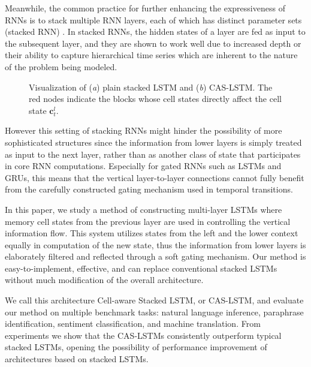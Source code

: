 \documentclass[wcp]{jmlr}
\begin{document}
    Meanwhile, the common practice for further enhancing  the expressiveness of RNNs is to stack multiple RNN layers, each of which has distinct parameter sets (stacked RNN) \citep{schmidhuber1992learning,el1996hierarchical}.
    In stacked RNNs, the hidden states of a layer are fed as input to the subsequent layer, and they are shown to work well due to increased depth \citep{pascanu2014construct} or their ability to capture hierarchical time series \citep{hermans2013training} which are inherent to the nature of the problem being modeled.
    
    \begin{figure}[tb]
        \centering
        \quad
        \caption{
            Visualization of (\textit{a}) plain stacked LSTM and (\textit{b}) CAS-LSTM.
            The red nodes indicate the blocks whose cell states directly affect the cell state $\mathbf{c}_t^l$.
        }
        \label{fig:comparison}
    \end{figure}
    
    However this setting of stacking RNNs might hinder the possibility of more sophisticated structures since the information from lower layers is simply treated as input to the next layer, rather than as another class of state that participates in core RNN computations.
    Especially for gated RNNs such as LSTMs and GRUs, this means that the vertical layer-to-layer connections cannot fully benefit from the carefully constructed gating mechanism used in temporal transitions.
    
    In this paper, we study a method of constructing multi-layer LSTMs where memory cell states from the previous layer are used in controlling the vertical information flow.
    This system utilizes states from the left and the lower context equally in computation of the new state, thus the information from lower layers is elaborately filtered and reflected through a soft gating mechanism. Our method is easy-to-implement, effective, and can replace conventional stacked LSTMs without much modification of the overall architecture.
    
    We call this architecture Cell-aware Stacked LSTM, or CAS-LSTM, and evaluate our method on multiple benchmark tasks: natural language inference, paraphrase identification, sentiment classification, and machine translation.
    From experiments we show that the CAS-LSTMs consistently outperform typical stacked LSTMs, opening the possibility of performance improvement of architectures based on stacked LSTMs.
    
\end{document}
